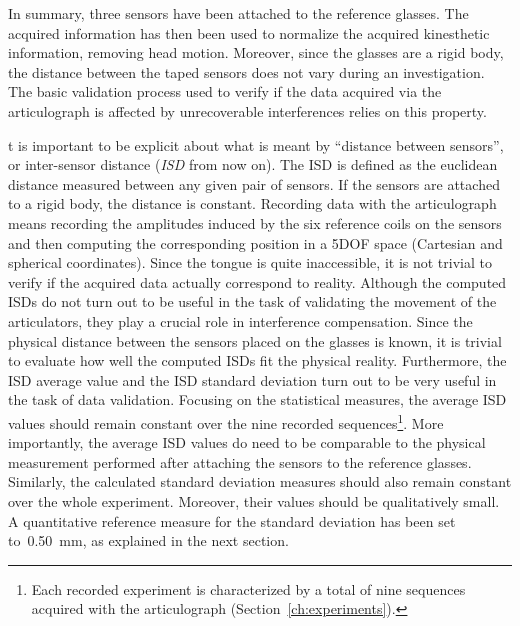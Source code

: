 In summary, three sensors have been attached to the reference
glasses. The acquired information has then been used to normalize the acquired
kinesthetic information, removing head motion. 
Moreover, since the glasses are a rigid body, the distance between the taped 
sensors does not vary during an investigation.
The basic validation process used to verify if the data acquired via the 
articulograph is affected by unrecoverable interferences relies on 
this property.

t is important to be explicit about what is meant by
 ``distance between sensors'', or inter-sensor distance 
(\emph{ISD} from now on).
The ISD is defined as the euclidean distance measured between any given pair 
of sensors.
If the sensors are attached to a rigid body, the distance is constant. 
Recording data with the articulograph means recording the amplitudes induced
by the six reference coils on the sensors and then computing the corresponding
position in a 5DOF space (Cartesian and spherical coordinates).
Since the tongue is quite inaccessible, it is not trivial to verify if the
acquired data actually correspond to reality.
Although the computed ISDs do not turn out to be useful 
in the task of validating
the movement of the articulators, they play a crucial role in 
interference compensation.
Since the physical distance between the sensors placed on the glasses is
known, it is trivial to evaluate how well the computed ISDs fit the physical
reality.
Furthermore, the ISD average value and the ISD standard deviation 
turn out to be very useful in the task of data validation.
Focusing on the statistical measures, the average ISD values should remain
constant over the nine recorded sequences\footnote{Each recorded experiment is
characterized by a total of nine sequences acquired with the articulograph 
(Section~\ref{ch:experiments}).}.
More importantly, the average ISD values do need to be comparable to the
physical measurement performed after attaching the sensors to the reference
glasses.
Similarly, the calculated standard deviation measures should also remain
constant over the whole experiment.
Moreover, their values should be qualitatively small.
A quantitative reference measure for the standard deviation has been set
to~0.50~mm, as explained in the next section.

